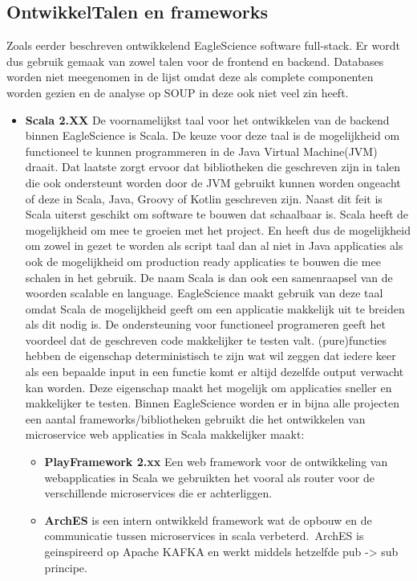 \subsection{OntwikkelTalen en frameworks}\label{subsec:ontwikkeltalen-en-frameworks}
Zoals eerder beschreven ontwikkelend EagleScience software full-stack. Er wordt dus gebruik gemaak van zowel talen voor de frontend en backend. Databases worden niet meegenomen in de lijst omdat deze als complete componenten worden gezien en de analyse op SOUP in deze ook niet veel zin heeft.
\begin{itemize}
    \item \textbf{Scala 2.XX} De voornamelijkst taal voor het ontwikkelen van de backend binnen EagleScience is Scala. De keuze voor deze taal is de mogelijkheid om functioneel te kunnen programmeren in de Java Virtual Machine(JVM) draait. Dat laatste zorgt ervoor dat bibliotheken die geschreven zijn in talen die ook ondersteunt worden door de JVM gebruikt kunnen worden ongeacht of deze in Scala, Java, Groovy of Kotlin geschreven zijn. Naast dit feit is Scala uiterst geschikt om software te bouwen dat schaalbaar is. Scala heeft de mogelijkheid om mee te groeien met het project. En heeft dus de mogelijkheid om zowel in gezet te worden als script taal dan al niet in Java applicaties als ook de mogelijkheid om production ready applicaties te bouwen die mee schalen in het gebruik. De naam Scala is dan ook een samenraapsel van de woorden scalable en language.
    EagleScience maakt gebruik van deze taal omdat Scala de mogelijkheid geeft om een applicatie makkelijk uit te breiden als dit nodig is. De ondersteuning voor functioneel programeren geeft het voordeel dat de geschreven code makkelijker te testen valt. (pure)functies hebben de eigenschap deterministisch te zijn wat wil zeggen dat iedere keer als een bepaalde input in een functie komt er altijd dezelfde output verwacht kan worden. Deze eigenschap maakt het mogelijk om applicaties sneller en makkelijker te testen. Binnen EagleScience worden er in bijna alle projecten een aantal frameworks/bibliotheken gebruikt die het ontwikkelen van microservice web applicaties in Scala makkelijker maakt:
    \begin{itemize}
        \item \textbf{PlayFramework 2.xx} Een web framework voor de ontwikkeling van webapplicaties in Scala we gebruikten het vooral als router voor de verschillende microservices die er achterliggen.
        \item \textbf{ArchES} is een intern ontwikkeld framework wat de opbouw en de communicatie tussen microservices in scala verbeterd.\ ArchES is geinspireerd op Apache KAFKA en werkt middels hetzelfde pub -> sub principe.
    \end{itemize}
\end{itemize}

